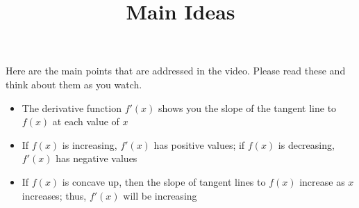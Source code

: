\documentclass[handout]{ximera}
\title{Main Ideas}
\begin{document}
\begin{abstract}
\end{abstract}

\maketitle

Here are the main points that are addressed in the video. Please read these and think about them as you watch.


\begin{itemize}
\item The derivative function $f'(x)$ shows you the slope of the tangent line to $f(x)$ at each value of $x$
\item If $f(x)$ is increasing, $f'(x)$ has positive values; if $f(x)$ is decreasing, $f'(x)$ has negative values
\item If $f(x)$ is concave up, then the slope of tangent lines to $f(x)$ increase as $x$ increases; thus, $f'(x)$ will be increasing
\end{itemize}
\end{document}
